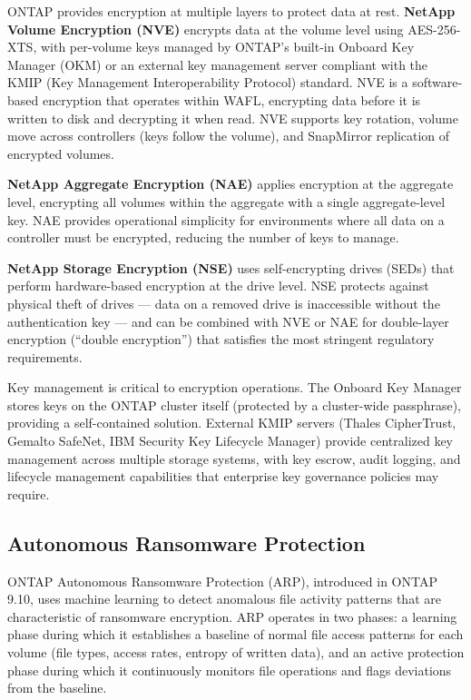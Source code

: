 \begin{securitybox}
ONTAP provides encryption at multiple layers to protect data at rest. \textbf{NetApp Volume Encryption (NVE)} encrypts data at the volume level using AES-256-XTS, with per-volume keys managed by ONTAP's built-in Onboard Key Manager (OKM) or an external key management server compliant with the KMIP (Key Management Interoperability Protocol) standard. NVE is a software-based encryption that operates within WAFL, encrypting data before it is written to disk and decrypting it when read. NVE supports key rotation, volume move across controllers (keys follow the volume), and SnapMirror replication of encrypted volumes.

\textbf{NetApp Aggregate Encryption (NAE)} applies encryption at the aggregate level, encrypting all volumes within the aggregate with a single aggregate-level key. NAE provides operational simplicity for environments where all data on a controller must be encrypted, reducing the number of keys to manage.

\textbf{NetApp Storage Encryption (NSE)} uses self-encrypting drives (SEDs) that perform hardware-based encryption at the drive level. NSE protects against physical theft of drives --- data on a removed drive is inaccessible without the authentication key --- and can be combined with NVE or NAE for double-layer encryption (``double encryption'') that satisfies the most stringent regulatory requirements.

Key management is critical to encryption operations. The Onboard Key Manager stores keys on the ONTAP cluster itself (protected by a cluster-wide passphrase), providing a self-contained solution. External KMIP servers (Thales CipherTrust, Gemalto SafeNet, IBM Security Key Lifecycle Manager) provide centralized key management across multiple storage systems, with key escrow, audit logging, and lifecycle management capabilities that enterprise key governance policies may require.

\subsection*{Autonomous Ransomware Protection}

ONTAP Autonomous Ransomware Protection (ARP), introduced in ONTAP 9.10, uses machine learning to detect anomalous file activity patterns that are characteristic of ransomware encryption. ARP operates in two phases: a learning phase during which it establishes a baseline of normal file access patterns for each volume (file types, access rates, entropy of written data), and an active protection phase during which it continuously monitors file operations and flags deviations from the baseline.


\end{securitybox}
